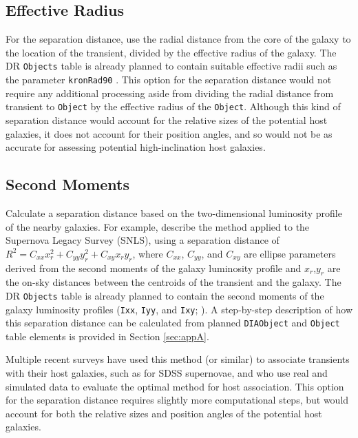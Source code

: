 \documentclass[DM,authoryear,toc]{lsstdoc}
\begin{document}
\subsection{Effective Radius}\label{ssec:options_Re}

For the separation distance, use the radial distance from the core of the galaxy to the location of the transient, divided by the effective radius of the galaxy.
The DR {\tt Objects} table is already planned to contain suitable effective radii such as the parameter {\tt kronRad90} .
This option for the separation distance would not require any additional processing aside from dividing the radial distance from transient to {\tt Object} by the effective radius of the {\tt Object}.
Although this kind of separation distance would account for the relative sizes of the potential host galaxies, it does not account for their position angles, and so would not be as accurate for assessing potential high-inclination host galaxies.

\subsection{Second Moments}

Calculate a separation distance based on the two-dimensional luminosity profile of the nearby galaxies.
For example, \citet{2006ApJ...648..868S} describe the method applied to the Supernova Legacy Survey (SNLS), using a separation distance of $R^2 = C_{xx} x_r^2 + C_{yy} y_r^2 + C_{xy} x_r y_r$, where $C_{xx}$, $C_{yy}$, and $C_{xy}$ are ellipse parameters derived from the second moments of the galaxy luminosity profile and $x_r$,$y_r$ are the on-sky distances between the centroids of the transient and the galaxy.
The DR {\tt Objects} table is already planned to contain the second moments of the galaxy luminosity profiles ({\tt Ixx}, {\tt Iyy}, and {\tt Ixy}; ).
A step-by-step description of how this separation distance can be calculated from planned {\tt DIAObject} and {\tt Object} table elements is provided in Section \ref{sec:appA}.

Multiple recent surveys have used this method (or similar) to associate transients with their host galaxies, such as \citet{2018PASP..130f4002S} for SDSS supernovae, and \citet{2016AJ....152..154G} who use real and simulated data to evaluate the optimal method for host association.
This option for the separation distance requires slightly more computational steps, but would account for both the relative sizes and position angles of the potential host galaxies. 
\end{document}
